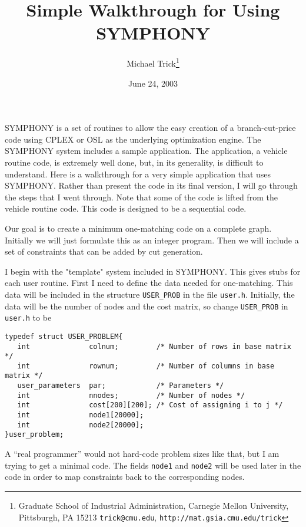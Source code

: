 \documentclass[11pt]{article}
\begin{document}
\title{Simple Walkthrough for Using SYMPHONY}
\author{Michael Trick\thanks{Graduate School of Industrial Administration,
Carnegie Mellon University, Pittsburgh, PA 15213 \texttt{trick@cmu.edu}, 
\texttt{http://mat.gsia.cmu.edu/trick}}}

\date{June 24, 2003}
\maketitle
\thispagestyle{empty}

SYMPHONY is a set of routines to allow the easy creation of a branch-cut-price
code using CPLEX or OSL as the underlying optimization engine. The SYMPHONY
system includes a sample application. The application, a vehicle routine code,
is extremely well done, but, in its generality, is difficult to understand.
Here is a walkthrough for a very simple application that uses SYMPHONY. Rather
than present the code in its final version, I will go through the steps that I
went through. Note that some of the code is lifted from the vehicle routine
code. This code is designed to be a sequential code.

Our goal is to create a minimum one-matching code on a complete graph.
Initially we will just formulate this as an integer program. Then we will
include a set of constraints that can be added by cut generation.

I begin with the "template" system included in SYMPHONY. This gives stubs for
each user routine. First I need to define the data needed for
one-matching. This data will be included in the structure \texttt{USER\_PROB}
in the file \texttt{user.h}.  Initially, the data will be the number of nodes
and the cost matrix, so change \texttt{USER\_PROB} in \texttt{user.h} to be

\begin{verbatim}
typedef struct USER_PROBLEM{
   int              colnum;         /* Number of rows in base matrix */
   int              rownum;         /* Number of columns in base matrix */
   user_parameters  par;            /* Parameters */
   int              nnodes;         /* Number of nodes */
   int              cost[200][200]; /* Cost of assigning i to j */ 
   int              node1[20000];
   int              node2[20000];
}user_problem;
\end{verbatim}

A ``real programmer'' would not hard-code problem sizes like that, but I am
trying to get a minimal code. The fields \texttt{node1} and \texttt{node2} will
be used later in the code in order to map constraints back to the
corresponding nodes.
\end{document}
